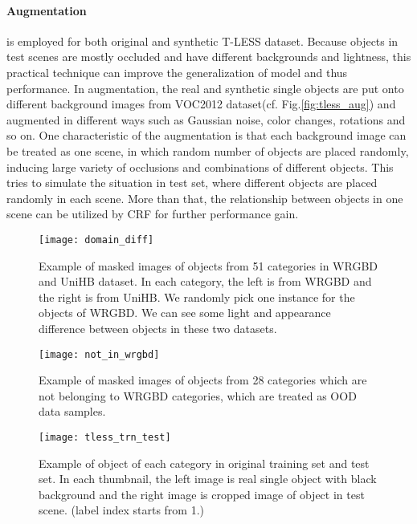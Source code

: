 \paragraph{Augmentation} is employed for both original and synthetic T-LESS dataset. Because objects in test scenes are mostly occluded and have different backgrounds and lightness, this practical technique can improve the generalization of model and thus performance. In augmentation, the real and synthetic single objects are put onto different background images from VOC2012 dataset\cite{pascal-voc-2012}(cf. Fig.\ref{fig:tless_aug}) and augmented in different ways such as Gaussian noise, color changes, rotations and so on. One characteristic of the augmentation is that each background image can be treated as one scene, in which random number of objects are placed randomly, inducing large variety of occlusions and combinations of different objects. This tries to simulate the situation in test set, where different objects are placed randomly in each scene. More than that, the relationship between objects in one scene can be utilized by CRF for further performance gain.

 \begin{figure}[H]
 	\begin{center}
 		\texttt{[image: domain\_diff]}
 		\caption{Example of masked images of objects from 51 categories in WRGBD and UniHB dataset. In each category, the left is from WRGBD and the right is from UniHB. We randomly pick one instance for the objects of WRGBD. We can see some light and appearance difference between objects in these two datasets.}		
 		\label{fig:wrgbd2}
 	\end{center}
 \end{figure}

\begin{figure}[H]
	\begin{center}
		\texttt{[image: not\_in\_wrgbd]}
		\caption{Example of masked images of objects from 28 categories which are not belonging to WRGBD categories, which are treated as OOD data samples.}		
		\label{fig:not_in_wrgbd}
	\end{center}
\end{figure} 

\begin{figure}[H]
	\begin{center}
		\texttt{[image: tless\_trn\_test]}
		\caption{Example of object of each category in original training set and test set. In each thumbnail, the left image is real single object with black background and the right image is cropped image of object in test scene. (label index starts from 1.)}		
		\label{fig:tless_ori}
	\end{center}
\end{figure} 

